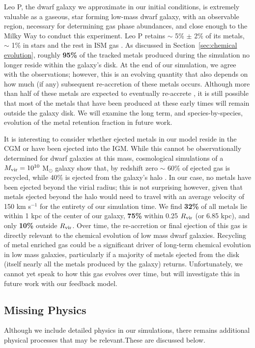 \documentclass[twocolumn]{aastex61}
\begin{document}
Leo P, the dwarf galaxy we approximate in our initial conditions, is extremely valuable as a gaseous, star forming low-mass dwarf galaxy, with an observable  region, necessary for determining gas phase abundances, and close enough to the Milky Way to conduct this experiment. Leo P retains $\sim$ 5\% $\pm$ 2\% of its metals, $\sim$ 1\% in stars and the rest in ISM gas \citep{McQuinn2015}. As discussed in Section~\ref{sec:chemical evolution}, roughly \textbf{95\%} of the tracked metals produced during the simulation no longer reside within the galaxy's disk. At the end of our simulation, we agree with the observations; however, this is an evolving quantity that also depends on how much (if any) subsequent re-accretion of these metals occurs. Although more than half of these metals are expected to eventually re-accrete \citep{Angles-Alcazar2017}, it is still possible that
most of the metals that have been produced at these early times will remain outside the galaxy disk. We will examine the long term, and species-by-species, evolution of the metal retention fraction in future work.

It is interesting to consider whether ejected metals in our model reside in the CGM or have been ejected into the IGM. While this cannot be observationally determined for dwarf galaxies at this mass, cosmological simulations of a $M_{\rm vir} = 10^{10}$ M$_{\odot}$ galaxy show that, by redshift zero $\sim$ 60\% of ejected gas is recycled, while 40\% is ejected from the galaxy's halo \citep{Angles-Alcazar2017}. In our case, no metals have been ejected beyond the virial radius; this is not surprising however, given that metals ejected beyond the halo would need to travel with an average velocity of 150 km s$^{-1}$ for the entirety of our simulation time.  We find \textbf{32\%} of all metals lie within 1 kpc of the center of our galaxy, \textbf{75\%} within 0.25 $R_{\rm vir}$ (or 6.85 kpc), and only \textbf{10\%} outside $R_{\rm vir}$. Over time, the re-accretion or final ejection of this gas is directly relevant to the chemical evolution of low mass dwarf galaxies. Recycling of metal enriched gas could be a significant driver of long-term chemical evolution in low mass galaxies, particularly if a majority of metals ejected from the disk (itself nearly all the metals produced by the galaxy) returns. Unfortunately, we cannot yet speak to how this gas evolves over time, but will investigate this in future work with our feedback model.

\subsection{Missing Physics}
Although we include detailed physics in our simulations, there remains additional physical processes that may be relevant.These are discussed below.
\end{document}
